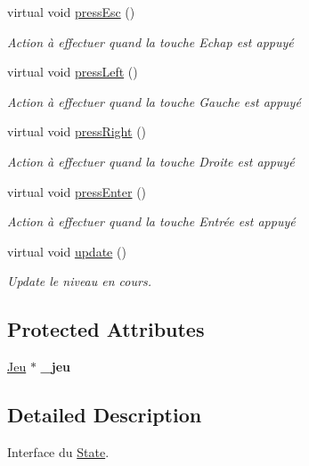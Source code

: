 \begin{DoxyCompactItemize}
virtual void \hyperlink{class_state_a2717680ed591de1f09250b6c7548209a}{press\+Esc} ()
\begin{DoxyCompactList}\small\item\em Action à effectuer quand la touche Echap est appuyé \end{DoxyCompactList}\item 
virtual void \hyperlink{class_state_aa2633a4a944f0b68bfb3bbf7b8029dcc}{press\+Left} ()
\begin{DoxyCompactList}\small\item\em Action à effectuer quand la touche Gauche est appuyé \end{DoxyCompactList}\item 
virtual void \hyperlink{class_state_a8af37cc742f499101673fd42425a113f}{press\+Right} ()
\begin{DoxyCompactList}\small\item\em Action à effectuer quand la touche Droite est appuyé \end{DoxyCompactList}\item 
virtual void \hyperlink{class_state_a62d60bde66bc403c40ece17e069a616d}{press\+Enter} ()
\begin{DoxyCompactList}\small\item\em Action à effectuer quand la touche Entrée est appuyé \end{DoxyCompactList}\item 
virtual void \hyperlink{class_state_a1c39ad3bdaa33864ee474b6be0e3e44d}{update} ()
\begin{DoxyCompactList}\small\item\em Update le niveau en cours. \end{DoxyCompactList}\end{DoxyCompactItemize}
\subsection*{Protected Attributes}
\begin{DoxyCompactItemize}
\item 
\hypertarget{class_state_aa155bffcebfe54c1f3787f596379a6bf}{\hyperlink{class_jeu}{Jeu} $\ast$ {\bfseries \+\_\+jeu}}\label{class_state_aa155bffcebfe54c1f3787f596379a6bf}

\end{DoxyCompactItemize}


\subsection{Detailed Description}
Interface du \hyperlink{class_state}{State}. 

